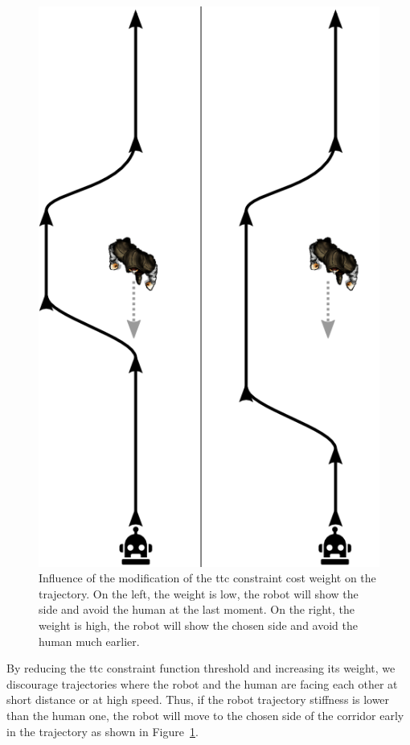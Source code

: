 \documentclass[a4paper,11pt,twoside]{StyleThese}
\begin{document}
\begin{figure}[hbtp]
\centering
\includegraphics[scale=0.3]{figures/chapter2/condition_1_proactivity_shrink.png}
\caption{Influence of the modification of the \acrshort{ttc} constraint cost weight on the trajectory. On the left, the weight is low, the robot will show the side and avoid the human at the last moment. On the right, the weight is high, the robot will show the chosen side and avoid the human much earlier.}
\label{fig:ttc_explanations}
\end{figure}

By reducing the \acrshort{ttc} constraint function threshold and increasing its weight, we discourage trajectories where the robot and the human are facing each other at short distance or at high speed. Thus, if the robot trajectory stiffness is lower than the human one, the robot will move to the chosen side of the corridor early in the trajectory as shown in Figure~\ref{fig:ttc_explanations}.
\end{document}
